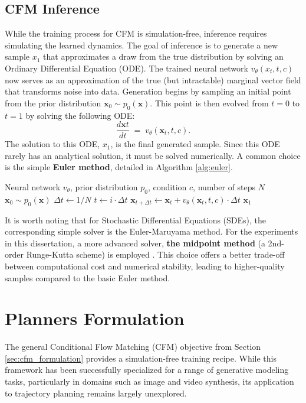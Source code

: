 \subsection{CFM Inference}
While the training process for CFM is simulation-free, inference requires simulating the learned dynamics. The goal of inference is to generate a new sample  $x_1$  that approximates a draw from the true distribution by solving an Ordinary Differential Equation (ODE). The trained neural network $v_\theta(x_t, t, c)$ now serves as an approximation of the true (but intractable) marginal vector field that transforms noise into data. Generation begins by sampling an initial point from the prior distribution $\mathbf{x}_0 \sim p_0(\mathbf{x})$. This point is then evolved from $t=0$ to $t=1$ by solving the following ODE:
\begin{equation}
	\frac{d\mathbf{x}t}{dt} \;=\; v_\theta(\mathbf{x}_t, t, c).
\end{equation}
The solution to this ODE, $x_1$, is the final generated sample. Since this ODE rarely has an analytical solution, it must be solved numerically. A common choice is the simple \textbf{Euler method}, detailed in Algorithm \ref{alg:euler}.
\begin{algorithm}
	\caption{Euler Method}\label{alg:euler}
	\begin{algorithmic}[1]
	\Require Neural network $v_\theta$, prior distribution $p_0$, condition $c$, number of steps $N$
	\State $\mathbf{x}_0 \sim p_0(\mathbf{x})$ 
	\State $\Delta t \gets 1/N$
    		\State $t \gets i \cdot \Delta t$
		    \State $\mathbf{x}_{t+\Delta t} \gets \mathbf{x}_t + v_\theta(\mathbf{x}_t, t, c) \cdot \Delta t$ 
		\EndFor
	\State \Return $\mathbf{x}_1$
\end{algorithmic}
\end{algorithm}

 It is worth noting that for Stochastic Differential Equations (SDEs), the corresponding simple solver is the Euler-Maruyama method. For the experiments in this dissertation, a more advanced solver, \textbf{the midpoint method} (a 2nd-order Runge-Kutta scheme) is employed \cite{lipmanFlowMatchingGuide2024a}. This choice offers a better trade-off between computational cost and numerical stability, leading to higher-quality samples compared to the basic Euler method.

\section{Planners Formulation}
\label{sec:planners}
The general Conditional Flow Matching (CFM) objective from Section \ref{sec:cfm_formulation} provides a simulation-free training recipe. While this framework has been successfully specialized for a range of generative modeling tasks, particularly in domains such as image and video synthesis, its application to trajectory planning remains largely unexplored.


